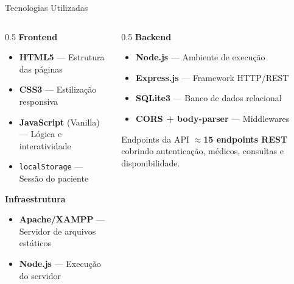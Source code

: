 \documentclass[xcolor={table}]{beamer}
\begin{document}
\begin{frame}{Tecnologias Utilizadas}
    \begin{columns}
        \begin{column}{0.5\textwidth}
            \textbf{Frontend}
            \begin{itemize}
                \item \textbf{HTML5} — Estrutura das páginas
                \item \textbf{CSS3} — Estilização responsiva
                \item \textbf{JavaScript} (Vanilla) — Lógica e interatividade
                \item \texttt{localStorage} — Sessão do paciente
            \end{itemize}
            \vspace{0.3cm}
            \textbf{Infraestrutura}
            \begin{itemize}
                \item \textbf{Apache/XAMPP} — Servidor de arquivos estáticos
                \item \textbf{Node.js} — Execução do servidor
            \end{itemize}
        \end{column}
        \begin{column}{0.5\textwidth}
            \textbf{Backend}
            \begin{itemize}
                \item \textbf{Node.js} — Ambiente de execução
                \item \textbf{Express.js} — Framework HTTP/REST
                \item \textbf{SQLite3} — Banco de dados relacional
                \item \textbf{CORS + body-parser} — Middlewares
            \end{itemize}
            \vspace{0.3cm}
            \begin{block}{Endpoints da API}
                \small
                $\approx$\textbf{15 endpoints REST} cobrindo autenticação,
                médicos, consultas e disponibilidade.
            \end{block}
        \end{column}
    \end{columns}
\end{frame}
\end{document}
